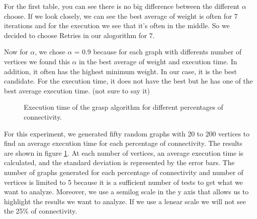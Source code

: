 For the first table, you can see there is no big difference between the different $\alpha$ choose.
If we look closely, we can see the best average of weight is often for 7 iterations and for the execution we see that it's often in the middle.
So we decided to choose Retries in our alogorithm for 7.
\bigskip

Now for $\alpha$, we chose $\alpha$ = 0.9 because for each graph with differents number of vertices we found this $\alpha$ in the best average of weight and execution time.
In addition, it often has the highest  minimum weight. In our case, it is the best candidate.
For the execution time, it does not have the best but he has one of the best average execution time.  (not sure to say it)


\begin{figure}[H]
    \centering
    \caption{Execution time of the grasp algorithm for different percentages of connectivity.}
    \label{fig:grasp_time}
\end{figure}

For this experiment, we generated fifty random graphs with 20 to 200 vertices to
find an average execution time for each percentage of connectivity. The results
are shown in figure \ref{fig:grasp_time}. At each number of vertices, an average
execution time is calculated, and the standard deviation is represented by the
error bars. The number of graphs generated for each
percentage of connectivity and number of vertices is limited to 5 because it is a sufficient
number of tests to get what we want to analyze. Moreover, we use a semilog scale in the y axis that allows
us to highlight the results we want to analyze. If we use a lenear scale we will not see the 25\% of connectivity.
